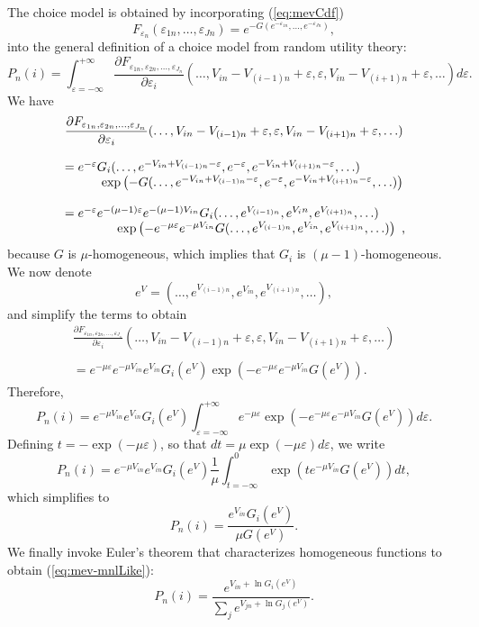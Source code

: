 \documentclass[12pt,a4paper]{article}
\newcommand{\req}[1]{(\ref{#1})}
\begin{document}
The  choice model is obtained by incorporating
\req{eq:mevCdf}
\[
F_{\varepsilon_n}(\varepsilon_{1n},\ldots,\varepsilon_{Jn}) =
e^{-G(e^{-\varepsilon_{1n}},\ldots,e^{-\varepsilon_{Jn}})},
\]
 into the general definition of a choice model from random utility theory:
\[
P_n(i) = \int_{\varepsilon=-\infty}^{+\infty} \frac{\partial F_{\varepsilon_{1n},\varepsilon_{2n},\ldots,\varepsilon_{J_n}}}{\partial \varepsilon_{i}}(\ldots,V_{in}-V_{(i-1)n}+\varepsilon,\varepsilon,V_{in}-V_{(i+1)n}+\varepsilon,\ldots)d\varepsilon.
\]
We have
\[
\begin{array}{l}
\displaystyle \frac{\partial F_{\varepsilon_{1n},\varepsilon_{2n},\ldots,\varepsilon_{J_n}}}{\partial \varepsilon_{i}}(\ldots,V_{in}-V_{(i-1)n}+\varepsilon,\varepsilon,V_{in}-V_{(i+1)n}+\varepsilon,\ldots) \\ \\ = e^{-\varepsilon} G_i(\ldots,e^{-V_{in}+V_{(i-1)n}-\varepsilon},e^{-\varepsilon},e^{-V_{in}+V_{(i+1)n}-\varepsilon},\ldots) \\
\multicolumn{1}{r}{\exp\left(-G(\ldots,e^{-V_{in}+V_{(i-1)n}-\varepsilon},e^{-\varepsilon},e^{-V_{in}+V_{(i+1)n}-\varepsilon},\ldots) \right)} \\ \\
 = e^{-\varepsilon} e^{-(\mu-1)\varepsilon} e^{-(\mu-1)V_{in}}G_i(\ldots,e^{V_{(i-1)n}},e^{V_in},e^{V_{(i+1)n}},\ldots) \\
\multicolumn{1}{r}{\exp\left(-e^{-\mu\varepsilon} e^{-\mu V_{in}}G(\ldots,e^{V_{(i-1)n}},e^{V_{in}},e^{V_{(i+1)n}},\ldots) \right)},
\end{array}
\]
because $G$ is $\mu$-homogeneous, which implies that $G_i$ is $(\mu-1)$-homogeneous.
We now denote 
\[
e^V = \left(\ldots,e^{V_{(i-1)n}},e^{V_{in}},e^{V_{(i+1)n}},\ldots\right),
\]
 and simplify the terms to obtain
\[
\begin{array}{l}
\displaystyle \frac{\partial F_{\varepsilon_{1n},\varepsilon_{2n},\ldots,\varepsilon_{J_n}}}{\partial \varepsilon_{i}}(\ldots,V_{in}-V_{(i-1)n}+\varepsilon,\varepsilon,V_{in}-V_{(i+1)n}+\varepsilon,\ldots) \\ \\ = e^{-\mu\varepsilon} e^{-\mu V_{in}} e^{V_{in}}G_i(e^V)
\exp\left(-e^{-\mu\varepsilon} e^{-\mu V_{in}}G(e^V) \right).
\end{array}
\]
Therefore,
\[
P_n(i) = e^{-\mu V_{in}}e^{V_{in}} G_i(e^V) \int_{\varepsilon=-\infty}^{+\infty} e^{-\mu\varepsilon} \exp\left(-e^{-\mu\varepsilon}e^{-\mu V_{in}}G(e^V)\right) d\varepsilon.
\]
Defining $t=-\exp(-\mu\varepsilon)$, so that $dt = \mu\exp(-\mu\varepsilon)d\varepsilon$, we write
\[
P_n(i) = e^{-\mu V_{in}}e^{V_{in}} G_i(e^V) \frac{1}{\mu}\int_{t=-\infty}^{0} \exp\left( t e^{-\mu V_{in}}G(e^V)\right) dt,
\]
which simplifies to
\[
P_n(i)=\frac{e^{V_{in}}G_i(e^V)}{\mu G(e^V)}.
\]
We finally invoke Euler's theorem that characterizes homogeneous functions to obtain \req{eq:mev-mnlLike}:
\[
P_n(i) = \frac{e^{V_{in} + \ln G_i\left(e^V\right)}}{\sum_j e^{V_{jn} + \ln G_j\left(e^V\right)}}.
\]
\end{document}
